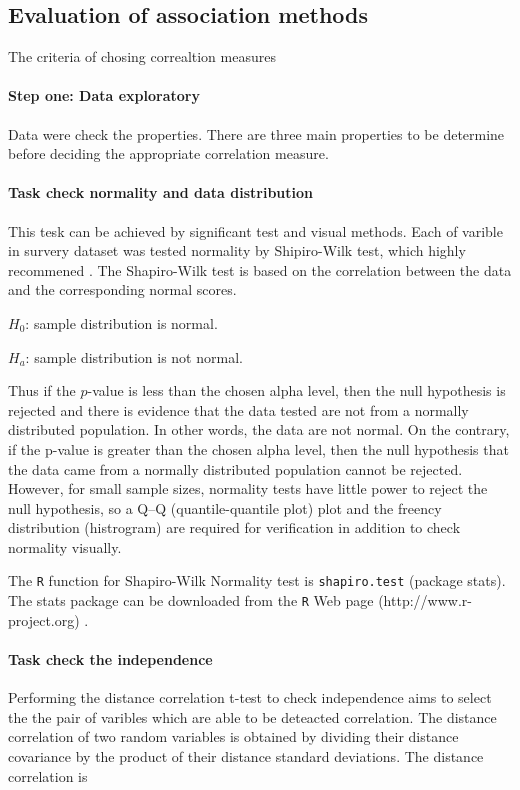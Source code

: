 \documentclass[a4paper]{article}
\begin{document}
\subsection*{Evaluation of association methods}
The criteria of chosing correaltion measures 
\paragraph{Step one: Data exploratory}
Data were check the properties. There are three main properties to be determine before deciding the appropriate correlation measure. 

\paragraph{Task check normality and data distribution}
This tesk can be achieved by significant test and visual methods. Each of varible in survery dataset was tested normality by Shipiro-Wilk test, which highly recommened \cite{ghasemi2012normality}. 
The Shapiro-Wilk test is based on the correlation between the data and the corresponding normal scores.

$H_{0}$: sample distribution is normal.

$H_{a}$: sample distribution is not normal.

Thus if the $p$-value is less than the chosen alpha level, then the null hypothesis is rejected and there is evidence that the data tested are not from a normally distributed population. In other words, the data are not normal. On the contrary, if the p-value is greater than the chosen alpha level, then the null hypothesis that the data came from a normally distributed population cannot be rejected. However, for small sample sizes, normality tests have little power to reject the null hypothesis, so a Q–Q (quantile-quantile plot) plot and the freency distribution (histrogram) are required for verification in addition to check normality visually.

The \texttt{R} function for Shapiro-Wilk Normality test is \texttt{shapiro.test} (package stats). The stats package can be downloaded from the \texttt{R} Web page (http://www.r-project.org) \cite{R:2014}.

\paragraph{Task check the independence}
Performing the distance correlation t-test\cite{szekely2007measuring} to check independence aims to select the the pair of varibles which are able to be deteacted correlation. The distance correlation of two random variables is obtained by dividing their distance covariance by the product of their distance standard deviations. The distance correlation is
\end{document}
